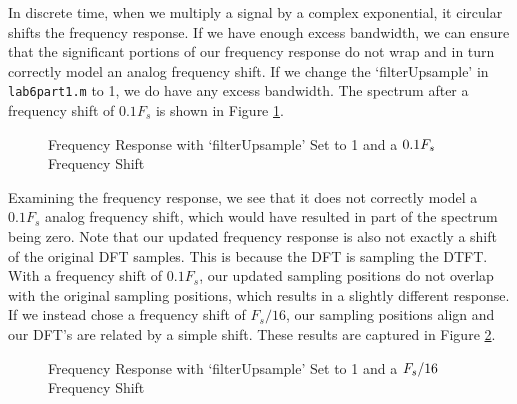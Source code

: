 \documentclass{article}
\begin{document}
In discrete time, when we multiply a signal by a complex exponential, it circular shifts the frequency response. If we have enough excess bandwidth, we can ensure that the significant portions of our frequency response do not wrap and in turn correctly model an analog frequency shift. If we change the `filterUpsample' in \texttt{lab6part1.m} to 1, we do have any excess bandwidth. The spectrum after a frequency shift of $0.1F_s$ is shown in Figure \ref{fig::psd_upsample_1}.

\begin{figure}[H]
	\centerline{}
	\caption{Frequency Response with `filterUpsample' Set to 1 and a $\protect{0.1F_s}$ Frequency Shift}
	\label{fig::psd_upsample_1}
\end{figure}

\noindent Examining the frequency response, we see that it does not correctly model a $0.1F_s$ analog frequency shift, which would have resulted in part of the spectrum being zero. Note that our updated frequency response is also not exactly a shift of the original DFT samples. This is because the DFT is sampling the DTFT. With a frequency shift of $0.1F_s$, our updated sampling positions do not overlap with the original sampling positions, which results in a slightly different response. If we instead chose a frequency shift of $F_s/16$, our sampling positions align and our DFT's are related by a simple shift. These results are captured in Figure \ref{fig::psd_upsample_1_mod_shift}.

\begin{figure}[H]
	\centerline{}
	\caption{Frequency Response with `filterUpsample' Set to 1 and a $\protect{F_s/16}$ Frequency Shift}
	\label{fig::psd_upsample_1_mod_shift}
\end{figure}
\end{document}
